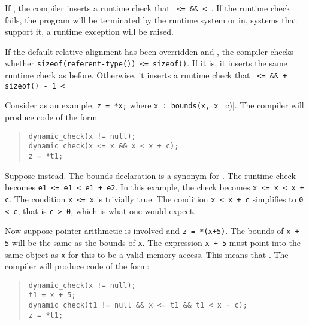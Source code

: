 If ,
the compiler inserts a runtime check that \texttt{ <=  \&\&
 < }. If the runtime check fails, the program
will be terminated by the runtime system or in, systems that support it,
a runtime exception will be raised.

If the default relative alignment has been overridden and
, the compiler checks whether
\texttt{sizeof(referent-type()) <= sizeof()}. If it is, it inserts the same
runtime check as before. Otherwise, it inserts a runtime check that
\texttt{ <=  \&\&  + sizeof() - 1 < }

Consider as an example, \verb|z = *x;| where 
\verb+x : bounds(x, x + c)|. The compiler will produce code of the form

\begin{quote}
\begin{verbatim}
dynamic_check(x != null);
dynamic_check(x <= x && x < x + c);
z = *t1;
\end{verbatim}
\end{quote}

Suppose  instead. The bounds declaration 
 is a synonym for 
.
The runtime check becomes \texttt{e1 \textless{}= e1 \textless{} e1 + e2}.
In this example, the check becomes \texttt{x \textless{}= x \textless{}
x + c}. The condition \texttt{x \textless{}= x} is trivially true. The
condition \texttt{x \textless{} x + c} simplifies to \texttt{0
\textless{} c}, that is \texttt{c \textgreater{} 0}, which is what one
would expect.

Now suppose pointer arithmetic is involved and \texttt{z = *(x+5)}. The
bounds of \texttt{x + 5} will be the same as the bounds of \texttt{x}.
The expression \texttt{x + 5} must point into the same object as
\texttt{x} for this to be a valid memory access. This means that
.
The compiler will produce code of the form:

\begin{quote}
\begin{verbatim}
dynamic_check(x != null);
t1 = x + 5;
dynamic_check(t1 != null && x <= t1 && t1 < x + c);
z = *t1;
\end{verbatim}
\end{quote}

